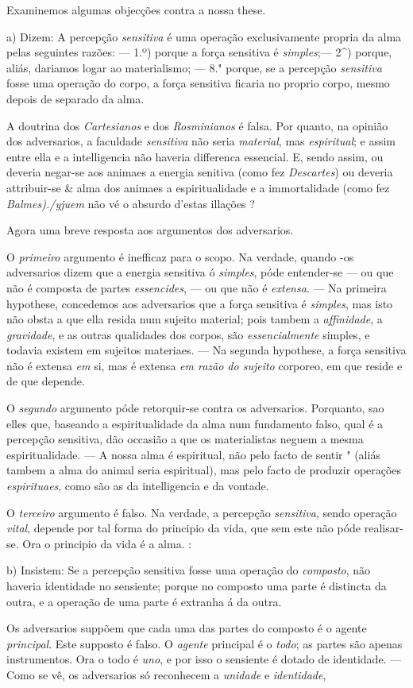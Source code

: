 Examinemos algumas objecções contra a nossa these.\par a) Dizem: A percepção \emph{sensitiva} é uma operação exclusivamente propria da alma pelas seguintes razões: --- 1.º) porque a força sensitiva é \emph{simples};--- 2\textasciicircum{}) porque, aliás, dariamos logar ao materialismo; --- 8." porque, se a percepção \emph{sensitiva} fosse uma operação do corpo, a força sensitiva ficaria no proprio corpo, mesmo depois de separado da alma.\par A doutrina dos \emph{Cartesianos} e dos \emph{Rosminianos} é falsa. Por quanto, na opinião dos adversarios, a faculdade \emph{sensitiva} não seria \emph{material}, mas \emph{espiritual}; e assim entre ella e a intelligencia não haveria differenca essencial. E, sendo assim, ou deveria negar-se aos animaes a energia senitiva (como fez \emph{Descartes}) ou deveria attribuir-se \& alma dos animaes a espiritualidade e a immortalidade (como fez \emph{Balmes)./yjuem} não vé o absurdo d'estas illações ?\par Agora uma breve resposta aos argumentos dos adversarios.\par O \emph{primeiro} argumento é inefficaz para o scopo. Na verdade, quando -os adversarios dizem que a energia sensitiva ó \emph{simples}, póde entender-se --- ou que não é composta de partes \emph{essencides}, --- ou que não é \emph{extensa}. --- Na primeira hypothese, concedemos aos adversarios que a força sensitiva é \emph{simples}, mas isto não obsta a que ella resida num sujeito material; pois tambem a \emph{affinidade}, a \emph{gravidade}, e as outras qualidades dos corpos, são \emph{essencialmente} simples, e todavia existem em sujeitos materiaes. --- Na segunda hypothese, a força sensitiva não é extensa \emph{em} si, mas é extensa \emph{em razão do sujeito} corporeo, em que reside e de que depende.\par O \emph{segundo} argumento póde retorquir-se contra os adversarios. Porquanto, sao elles que, baseando a espiritualidade da alma num fundamento falso, qual é a percepção sensitiva, dão occasião a que os materialistas neguem a mesma espiritualidade. --- A nossa alma é espiritual, não pelo facto de sentir " (aliás tambem a alma do animal seria espiritual), mas pelo facto de produzir operações \emph{espirituaes}, como são as da intelligencia e da vontade.\par O \emph{terceiro} argumento é falso. Na verdade, a percepção \emph{sensitiva}, sendo operação \emph{vital}, depende por tal forma do principio da vida, que sem este não póde realisar-se. Ora o principio da vida é a alma. :\par b) Insistem: Se a percepção sensitiva fosse uma operação do \emph{composto}, não haveria identidade no sensiente; porque no composto uma parte é distincta da outra, e a operação de uma parte é extranha á da outra.\par Os adversarios suppõem que cada uma das partes do composto é o agente \emph{principal}. Este supposto é falso. O \emph{agente} principal é o \emph{todo}; as partes são apenas instrumentos. Ora o todo é \emph{uno}, e por isso o sensiente é dotado de identidade. --- Como se vê, os adversarios só reconhecem a \emph{unidade} e \emph{identidade}, 